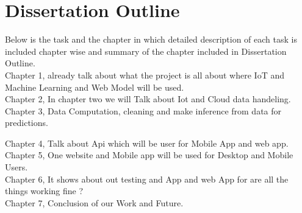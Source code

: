 \section{Dissertation Outline}

Below is the task and the chapter in which detailed description of each task is included chapter wise and summary of the chapter included in Dissertation Outline.\\


Chapter 1, already talk about what the project is all about where IoT and Machine Learning and Web Model will be used.\\


Chapter 2, In chapter two we will Talk about Iot and Cloud data handeling.  \\

Chapter 3, Data Computation, cleaning and make inference from data for predictions.


Chapter 4, Talk about Api which will be user for Mobile App and web app.\\


Chapter 5, One website and Mobile app will be used for Desktop and Mobile Users.\\

Chapter 6, It shows about out testing and App and web App for are all the things working fine ?\\

Chapter 7, Conclusion of our Work and Future.